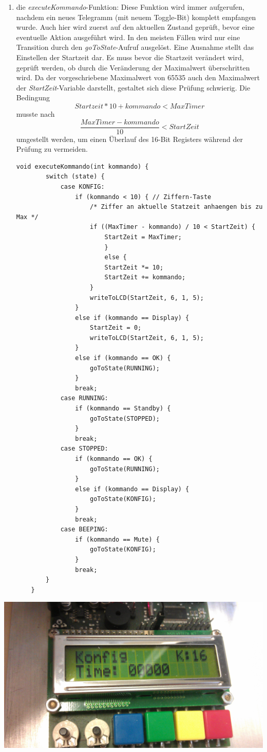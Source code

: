 \documentclass[12pt,a4paper,bibliography=totocnumbered,listof=totocnumbered]{scrartcl}
\begin{document}
\begin{enumerate}
	\item die \textit{executeKommando}-Funktion: \newline
	Diese Funktion wird immer aufgerufen, nachdem ein neues Telegramm (mit neuem Toggle-Bit) komplett empfangen wurde. Auch hier wird zuerst auf den aktuellen Zustand geprüft, bevor eine eventuelle Aktion ausgeführt wird. In den meisten Fällen wird nur eine Transition durch den \textit{goToState}-Aufruf ausgelöst. Eine Ausnahme stellt das Einstellen der Startzeit dar. Es muss bevor die Startzeit verändert wird, geprüft werden, ob durch die Veränderung der Maximalwert überschritten wird. Da der vorgeschriebene Maximalwert von 65535 auch den Maximalwert der \textit{StartZeit}-Variable darstellt, gestaltet sich diese Prüfung schwierig. Die Bedingung \[Startzeit*10+kommando < MaxTimer\] musste nach \[\frac{MaxTimer-kommando}{10}<StartZeit\] umgestellt werden, um einen Überlauf des 16-Bit Registers während der Prüfung zu vermeiden.
	
	\vspace{1em}
	\begin{lstlisting}[caption=die executeKommando-Funktion]
	void executeKommando(int kommando) {
		switch (state) {
			case KONFIG:
				if (kommando < 10) { // Ziffern-Taste
					/* Ziffer an aktuelle Statzeit anhaengen bis zu Max */
					if ((MaxTimer - kommando) / 10 < StartZeit) {
						StartZeit = MaxTimer;
						}
						else {
						StartZeit *= 10;
						StartZeit += kommando;
					}
					writeToLCD(StartZeit, 6, 1, 5);
				}
				else if (kommando == Display) {
					StartZeit = 0;
					writeToLCD(StartZeit, 6, 1, 5);
				}
				else if (kommando == OK) {
					goToState(RUNNING);					
				}
				break;
			case RUNNING:
				if (kommando == Standby) {
					goToState(STOPPED);
				}
				break;
			case STOPPED:
				if (kommando == OK) {
					goToState(RUNNING);
				}
				else if (kommando == Display) {
					goToState(KONFIG);
				}
				break;
			case BEEPING:
				if (kommando == Mute) {
					goToState(KONFIG);
				}
				break;
		}
	}
	\end{lstlisting}
	
	
\end{enumerate}
\vspace{1em}
\begin{minipage}{\linewidth}
	\centering
	\includegraphics[width=0.7\linewidth]{img/Fernbedienung.jpg}
	\label{fig:FernbedienungKonfig}
\end{minipage}
\end{document}
